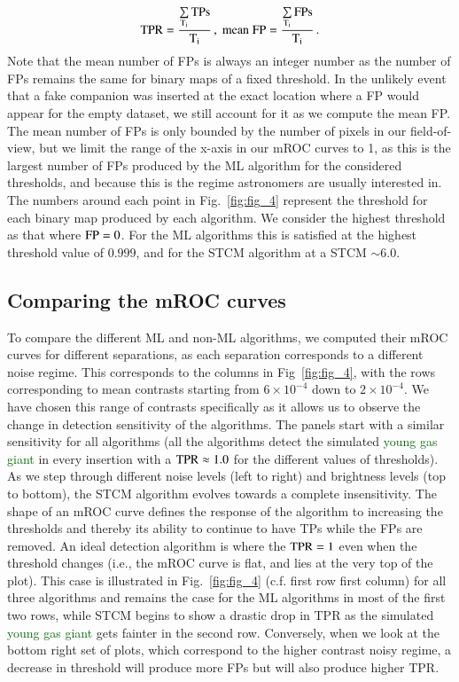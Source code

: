 \documentclass[referee]{aa} %
\newcommand{\newchange}[1]{\textcolor{darkgreen}{#1}}
\begin{document}
\begin{equation}
\rm{TPR} =\dfrac{\sum\limits_{T_i}\rm{TPs}}{T_i} \, , \; 
\rm{mean\; FP} = \dfrac{\sum\limits_{T_i}FPs}{T_i} \, .
\label{eq:TPR}
\end{equation}
Note that the mean number of FPs is always an integer number as the number of FPs remains the same for binary maps of a fixed threshold.
In the unlikely event that a fake companion was inserted at the exact location where a FP would appear for the empty dataset, we still account for it as we compute the mean FP. The mean number of FPs is only bounded by the number of pixels in our field-of-view, but we limit the range of the x-axis in our mROC curves to 1, as this is the largest number of FPs produced by the ML algorithm for the considered thresholds, and because this is the regime astronomers are usually interested in.
The numbers around each point in Fig.~\ref{fig:fig_4} represent the threshold for each binary map produced by each algorithm.
We consider the highest threshold as that where ${\rm FP} = 0$.
For the ML algorithms this is satisfied at the highest threshold value of $0.999$, and for the STCM algorithm at a STCM $\sim 6.0$. 

\subsection{Comparing the mROC curves}
\label{sec:roc}


To compare the different ML and non-ML algorithms, we computed their mROC curves for different separations, as each separation corresponds to a different noise regime.
This corresponds to the columns in Fig~\ref{fig:fig_4}, with the rows corresponding to mean contrasts starting from $6\times10^{-4}$ down to $2\times10^{-4}$.
We have chosen this range of contrasts specifically as it allows us to observe the change in detection sensitivity of the algorithms. The panels start with a similar sensitivity for all algorithms (all the algorithms detect the simulated \newchange{young gas giant} in every insertion with a ${\rm TPR}\approx 1.0$ for the different values of thresholds). 
As we step through different noise levels (left to right) and brightness levels (top to bottom), the STCM algorithm evolves towards a complete insensitivity.
The shape of an mROC curve defines the response of the algorithm to increasing the thresholds and thereby its ability to continue to have TPs while the FPs are removed.
An ideal detection algorithm is where the ${\rm TPR}=1$ even when the threshold changes (i.e., the mROC curve is flat, and lies at the very top of the plot).
This case is illustrated in Fig.~\ref{fig:fig_4}  (c.f. first row first column) for all three algorithms and remains the case for the ML algorithms in most of the first two rows, while STCM begins to show a drastic drop in TPR as the simulated \newchange{young gas giant} gets fainter in the second row.
Conversely, when we look at the bottom right set of plots, which correspond to the higher contrast noisy regime, a decrease in threshold will produce more FPs but will also produce higher TPR. 
\end{document}
